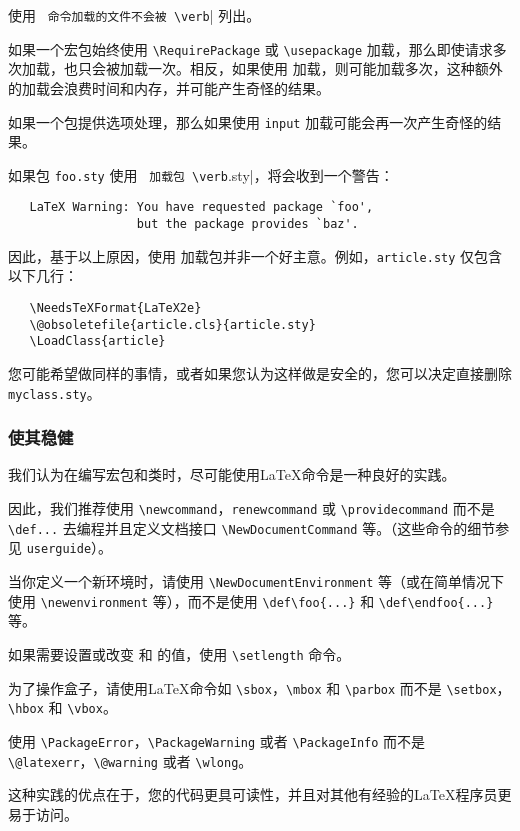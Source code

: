 \documentclass[12pt]{ltxguide}
\begin{document}
使用 \verb| 命令加载的文件不会被 \verb|\listfiles| 列出。

如果一个宏包始终使用 \verb|\RequirePackage| 或 \verb|\usepackage| 加载，那么即使请求多次加载，也只会被加载一次。相反，如果使用 \verb|| 加载，则可能加载多次，这种额外的加载会浪费时间和内存，并可能产生奇怪的结果。

如果一个包提供选项处理，那么如果使用 \verb|input| 加载可能会再一次产生奇怪的结果。

如果包 \verb|foo.sty| 使用 \verb| 加载包 \verb|\baz.sty|，将会收到一个警告：

\begin{verbatim}
   LaTeX Warning: You have requested package `foo',
                  but the package provides `baz'.
\end{verbatim}

因此，基于以上原因，使用 \verb|| 加载包并非一个好主意。例如，\verb|article.sty| 仅包含以下几行：
\begin{verbatim}
   \NeedsTeXFormat{LaTeX2e}
   \@obsoletefile{article.cls}{article.sty}
   \LoadClass{article}
\end{verbatim}

您可能希望做同样的事情，或者如果您认为这样做是安全的，您可以决定直接删除 \verb|myclass.sty|。
%
\subsubsection{使其稳健}
我们认为在编写宏包和类时，尽可能使用\LaTeX{}命令是一种良好的实践。

因此，我们推荐使用 \verb|\newcommand|，\verb|renewcommand| 或 \verb|\providecommand| 而不是 \verb|\def...| 去编程并且定义文档接口 \verb|\NewDocumentCommand| 等。（这些命令的细节参见 \texttt{userguide}）。

当你定义一个新环境时，请使用 \verb|\NewDocumentEnvironment| 等（或在简单情况下使用 \verb|\newenvironment| 等），而不是使用 \verb|\def\foo{...}| 和 \verb|\def\endfoo{...}| 等。

如果需要设置或改变  和  的值，使用 \verb|\setlength| 命令。

为了操作盒子，请使用\LaTeX{}命令如 \verb|\sbox|，\verb|\mbox| 和 \verb|\parbox| 而不是 \verb|\setbox|，\verb|\hbox| 和 \verb|\vbox|。

使用 \verb|\PackageError|，\verb|\PackageWarning| 或者 \verb|\PackageInfo| 而不是 \verb|\@latexerr|，\verb|\@warning| 或者 \verb|\wlong|。

这种实践的优点在于，您的代码更具可读性，并且对其他有经验的\LaTeX{}程序员更易于访问。
%
\end{document}
